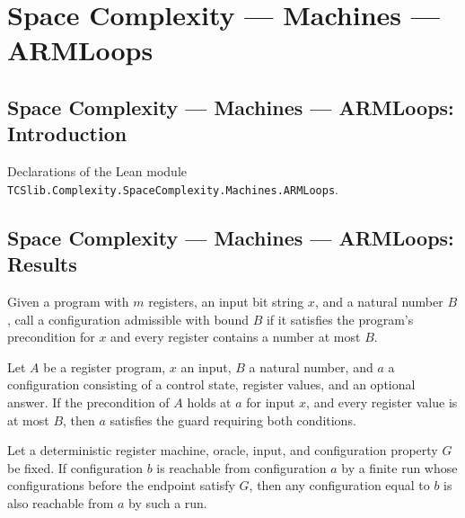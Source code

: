 \section{Space Complexity --- Machines --- ARMLoops}
\subsection*{Space Complexity --- Machines --- ARMLoops: Introduction}

Declarations of the Lean module \texttt{TCSlib.Complexity.SpaceComplexity.Machines.ARMLoops}.

\subsection*{Space Complexity --- Machines --- ARMLoops: Results}

\begin{definition}
\label{Complexity.LogProg.GuardLe}
\leanok
{}
Given a program with $m$ registers, an input bit string $x$, and a natural number $B$,
call a configuration admissible with bound $B$ if it satisfies the program’s
precondition for $x$ and every register contains a number at most $B$.
\end{definition}

\begin{lemma}
\label{Complexity.LogProg.GuardLe.of_preS}
\leanok
{}
Let $A$ be a register program, $x$ an input, $B$ a natural number, and $a$ a
configuration consisting of a control state, register values, and an optional answer. If
the precondition of $A$ holds at $a$ for input $x$, and every register value is at most
$B$, then $a$ satisfies the guard requiring both conditions.
\end{lemma}

\begin{lemma}
\label{Complexity.LogProg.reach_of_eq}
\leanok
{}
Let a deterministic register machine, oracle, input, and configuration property $G$ be
fixed. If configuration $b$ is reachable from configuration $a$ by a finite run whose
configurations before the endpoint satisfy $G$, then any configuration equal to $b$ is
also reachable from $a$ by such a run.
\end{lemma}

